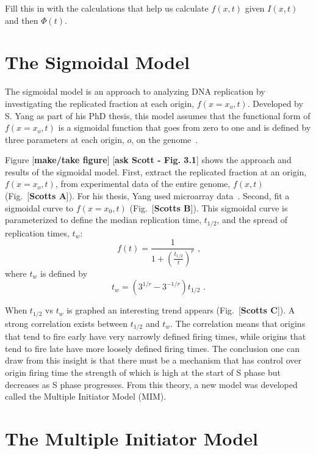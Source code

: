 		Fill this in with the calculations that help us calculate $f(x,t)$ given $I(x,t)$ and then $\Phi(t)$.
		

	\section{The Sigmoidal Model}
	\label{sec:SigmoidalModel}
	
	The sigmoidal model is an approach to analyzing DNA replication by investigating the replicated fraction at each origin, $f(x=x_o,t)$.
	Developed by S. Yang as part of his PhD thesis, this model assumes that the functional form of $f(x=x_o,t)$ is a sigmoidal function that goes from zero to one and is defined by three parameters at each origin, $o$, on the genome~\cite{ScottsPaper,ScottsThesis}.
	
	Figure [\textbf{make/take figure}] [\textbf{ask Scott - Fig. 3.1}] shows the approach and results of the sigmoidal model.
	First, extract the replicated fraction at an origin, $f(x=x_o,t)$, from experimental data of the entire genome, $f(x,t)$ (Fig.~[\textbf{Scotts A}]).
	For his thesis, Yang used microarray data~\cite{McCuneMicroArray}.
	Second, fit a sigmoidal curve to $f(x=x_0,t)$ (Fig.~[\textbf{Scotts B}]).
	This sigmoidal curve is parameterized to define the median replication time, $t_{1/2}$, and the spread of replication times, $t_w$:
	\begin{equation} \label{eq:SigmoidalModel}
		f(t) = {\frac{1}{1+\left({\frac{t_{1/2}}{t}}\right)^r}}\text{ ,}
	\end{equation}
	where $t_w$ is defined by
	\begin{equation}
		t_w = \left(3^{1/r}-3^{-1/r}\right)t_{1/2}\text{ .}
	\end{equation}
	
	When $t_{1/2}$ vs $t_w$ is graphed an interesting trend appears (Fig.~[\textbf{Scotts C}]).
	A strong correlation exists between $t_{1/2}$ and $t_w$.
	The correlation means that origins that tend to fire early have very narrowly defined firing times, while origins that tend to fire late have more loosely defined firing times.
	The conclusion one can draw from this insight is that there must be a mechanism that has control over origin firing time the strength of which is high at the start of S phase but decreases as S phase progresses\cite{ScottsThesis}.
	From this theory, a new model was developed called the Multiple Initiator Model (MIM).
	
	
	\section{The Multiple Initiator Model}
	\label{sec:MIM}
	
